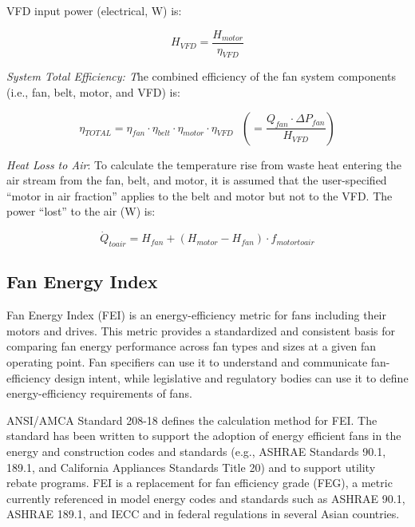 VFD input power (electrical, W) is:

\begin{equation}
{H_{VFD}} = \frac{{{H_{motor}}}}{{{\eta_{VFD}}}}
\end{equation}

\emph{System Total Efficiency: T}he combined efficiency of the fan system components (i.e., fan, belt, motor, and VFD) is:

\begin{equation}
{\eta_{TOTAL}} = {\eta_{fan}} \cdot {\eta_{belt}} \cdot {\eta_{motor}} \cdot {\eta_{VFD}} ~~~ \left( { = \frac{{{Q_{fan}} \cdot \Delta {P_{fan}}}}{{{H_{VFD}}}}} \right)
\end{equation}

\emph{Heat Loss to Air}: To calculate the temperature rise from waste heat entering the air stream from the fan, belt, and motor, it is assumed that the user-specified ``motor in air fraction'' applies to the belt and motor but not to the VFD. The power ``lost'' to the air (W) is:

\begin{equation}
{\dot Q_{toair}} = {H_{fan}} + \left( {{H_{motor}} - {H_{fan}}} \right) \cdot {f_{motortoair}}
\end{equation}

\subsection{Fan Energy Index}\label{fan-energy-index}

Fan Energy Index (FEI) is an energy-efficiency metric for fans including their motors and drives. This metric provides a standardized and consistent basis for comparing fan energy performance across fan types and sizes at a given fan operating point. Fan specifiers can use it to understand and communicate fan-efficiency design intent, while legislative and regulatory bodies can use it to define energy-efficiency requirements of fans.

ANSI/AMCA Standard 208-18 defines the calculation method for FEI. The standard has been written to support the adoption of energy efficient fans in the energy and construction codes and standards (e.g., ASHRAE Standards 90.1, 189.1, and California Appliances Standards Title 20) and to support utility rebate programs. FEI is a replacement for fan efficiency grade (FEG), a metric currently referenced in model energy codes and standards such as ASHRAE 90.1, ASHRAE 189.1, and IECC and in federal regulations in several Asian countries.

